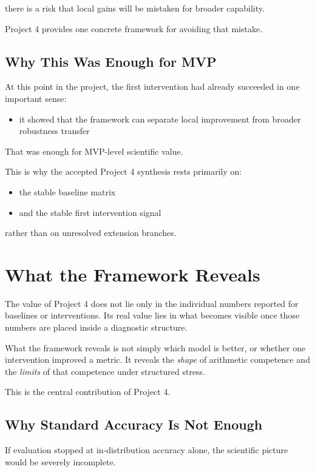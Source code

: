 \documentclass[11pt]{article}
\begin{document}
there is a risk that local gains will be mistaken for broader capability.

Project 4 provides one concrete framework for avoiding that mistake.

\subsection{Why This Was Enough for MVP}

At this point in the project, the first intervention had already succeeded in one important sense:
\begin{itemize}[leftmargin=1.5em]
    \item it showed that the framework can separate local improvement from broader robustness transfer
\end{itemize}

That was enough for MVP-level scientific value.

This is why the accepted Project 4 synthesis rests primarily on:
\begin{itemize}[leftmargin=1.5em]
    \item the stable baseline matrix
    \item and the stable first intervention signal
\end{itemize}
rather than on unresolved extension branches.

\section{What the Framework Reveals}

The value of Project 4 does not lie only in the individual numbers reported for baselines or interventions. Its real value lies in what becomes visible once those numbers are placed inside a diagnostic structure.

What the framework reveals is not simply which model is better, or whether one intervention improved a metric. It reveals the \emph{shape} of arithmetic competence and the \emph{limits} of that competence under structured stress.

This is the central contribution of Project 4.

\subsection{Why Standard Accuracy Is Not Enough}

If evaluation stopped at in-distribution accuracy alone, the scientific picture would be severely incomplete.
\end{document}

